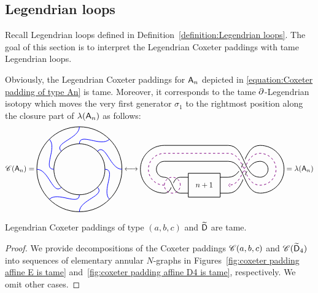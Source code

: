 \subsection{Legendrian loops}\label{sec:legendrian loop}
Recall Legendrian loops defined in Definition~\ref{definition:Legendrian loops}.
The goal of this section is to interpret the Legendrian Coxeter paddings with tame Legendrian loops.

Obviously, the Legendrian Coxeter paddings for $\mathsf{A}_n$ depicted in \eqref{equation:Coxeter padding of type An} is tame.
Moreover, it corresponds to the tame $\partial$-Legendrian isotopy which moves the very first generator $\sigma_1$ to the rightmost position along the closure part of $\lambda(\mathsf{A}_n)$ as follows:
\[
\coxeterpadding(\dynA_n)=
\begin{tikzpicture}[baseline=-.5ex,scale=0.4]
\draw[thick] (0,0) circle (5) (0,0) circle (3);
\foreach \i in {45, 90, ..., 360} {
\draw[blue, thick] (\i:5) to[out=\i-180,in=\i+45] (\i+45:3);
}
\end{tikzpicture}
\longleftrightarrow
\begin{tikzpicture}[baseline=-.5ex, scale=1.5]
\draw[thick] (-3, -0.75) to[out=0,in=180] (-2.5, -0.25) -- (-2.25, -0.25);
\draw[white, line width=5] (-3, -0.25) to[out=0,in=180] (-2.5, -0.75);
\draw[thick] (-3, -0.25) to[out=0,in=180] (-2.5, -0.75) -- (-2.25, -0.75);
\draw[thick] (-2.25, -0.125) rectangle (-1.25, -0.875) (-1.75, -0.5) node {$n+1$};
\draw[thick] (-1.25, -0.25) -- (-1, -0.25);
\draw[thick] (-1.25, -0.75) -- (-1, -0.75);
\draw[thick] (-1, -0.25) to[out=0,in=180] (0,0.75) arc (90:-90:0.75);
\draw[thick] (-1, -0.75) to[out=0,in=180] (0,0.25) arc (90:-90:0.25);
\draw[white, line width=5] (-1,0.25) to[out=0,in=180] (0, -0.75);
\draw[white, line width=5] (-1,0.75) to[out=0,in=180] (0, -0.25);
\draw[thick] (-3, -0.25) arc (-90:-270:0.25) -- (-1,0.25) to[out=0,in=180] (0, -0.75);
\draw[thick] (-3, -0.75) arc (-90:-270:0.75) -- (-1,0.75) to[out=0,in=180] (0, -0.25);
\draw[thick, violet, dashed] (-2.75, -0.5) circle (0.25);
\draw[thick, violet, dashed, ->] (-3,-0.5) arc (-90:-270:0.5) -- (-1, 0.5) to[out=0,in=180] (0, -0.5) arc (-90:90:0.5) to[out=180,in=0] (-1, -0.5);
\end{tikzpicture}
=\legendrian(\dynA_n)
\]

\begin{lemma}
Legendrian Coxeter paddings of type $(a,b,c)$ and $\widetilde{\mathsf{D}}$ are tame.
\end{lemma}
\begin{proof}
We provide decompositions of the Coxeter paddings $\mathscr{C}(a,b,c)$ and $\mathscr{C}(\widetilde{\mathsf{D}}_4)$ into sequences of elementary annular $N$-graphs in Figures~\ref{fig:coxeter padding affine E is tame} and~\ref{fig:coxeter padding affine D4 is tame}, respectively. We omit other cases.
\end{proof}


